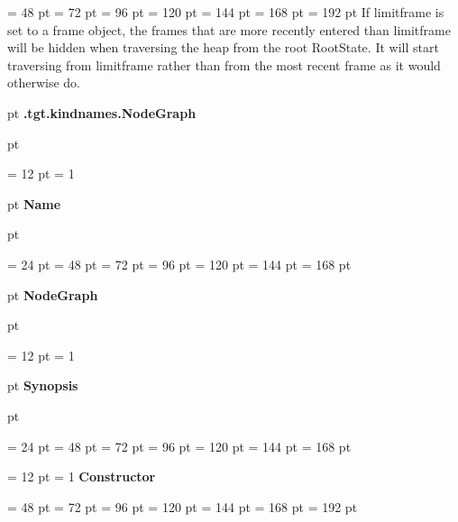 {{{{\par \noindent  \leftskip = 48 pt  \leftmargini = 72 pt  \leftmarginii = 96 pt  \leftmarginiii = 120 pt  \leftmarginiv = 144 pt  \leftmarginv = 168 pt  \leftmarginvi = 192 pt  If limitframe is set to a frame object, the frames that are more
recently entered than limitframe will be hidden when traversing the
heap from the root RootState. It will start traversing from limitframe
rather than from the most recent frame as it would otherwise do.
\par}
\par}
\par}
\par}
{\par \pagebreak[3]  pt \noindent
{\LARGE {\bf .tgt.kindnames.NodeGraph\/}}\par {} pt
} \noindent
{\par \noindent
{\par \pagebreak[3.300000] \noindent \hangindent = 12 pt \hangafter = 1 
{\par \pagebreak[3]  pt \noindent
{\Large {\bf Name\/}}\par {} pt
} \noindent
\par}
{\par \noindent  \leftskip = 24 pt  \leftmargini = 48 pt  \leftmarginii = 72 pt  \leftmarginiii = 96 pt  \leftmarginiv = 120 pt  \leftmarginv = 144 pt  \leftmarginvi = 168 pt {\par \pagebreak[3]  pt \noindent
{\Large {\bf NodeGraph\/}}\par {} pt
} \noindent
\par}
{\par \pagebreak[3.300000] \noindent \hangindent = 12 pt \hangafter = 1 
{\par \pagebreak[3]  pt \noindent
{\Large {\bf Synopsis\/}}\par {} pt
} \noindent
\par}
{\par \noindent  \leftskip = 24 pt  \leftmargini = 48 pt  \leftmarginii = 72 pt  \leftmarginiii = 96 pt  \leftmarginiv = 120 pt  \leftmarginv = 144 pt  \leftmarginvi = 168 pt {\par \noindent
{\par \pagebreak[3.200000] \noindent \hangindent = 12 pt \hangafter = 1 
{\large {\bf Constructor\/}}\par}
{\par \noindent  \leftskip = 48 pt  \leftmargini = 72 pt  \leftmarginii = 96 pt  \leftmarginiii = 120 pt  \leftmarginiv = 144 pt  \leftmarginv = 168 pt  \leftmarginvi = 192 pt {\par \noindent
}}}}}
